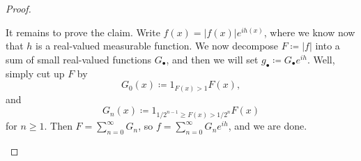 \documentclass[../notes.tex]{subfiles}
\begin{document}
\begin{proof}
\begin{listalph}
		It remains to prove the claim. Write $f(x)=\left|f(x)\right|e^{ih(x)}$, where we know now that $h$ is a real-valued measurable function. We now decompose $F\coloneqq\left|f\right|$ into a sum of small real-valued functions $G_\bullet$, and then we will set $g_\bullet\coloneqq G_\bullet e^{ih}$. Well, simply cut up $F$ by
		\[G_0(x)\coloneqq1_{F(x)>1}F(x),\]
		and
		\[G_n(x)\coloneqq1_{1/2^{n-1}\ge F(x)>1/2^{n}}F(x)\]
		for $n\ge1$. Then $F=\sum_{n=0}^\infty G_n$, so $f=\sum_{n=0}^\infty G_ne^{ih}$, and we are done.
		\qedhere
	\end{listalph}
\end{proof}
\end{document}
